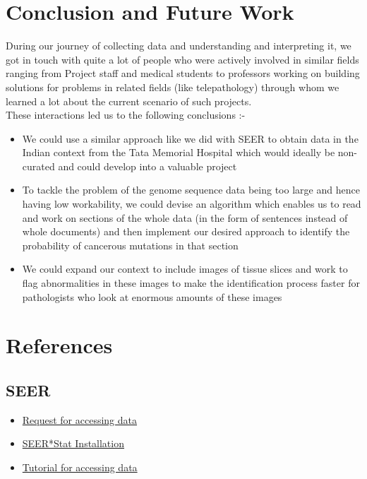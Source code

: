 \documentclass[15pt]{article}
\begin{document}
\section{Conclusion and Future Work}
During our journey of collecting data and understanding and interpreting it, we got in touch with quite \hspace*{5mm} a lot of people who were actively involved in similar fields ranging from Project staff and medical students \hspace*{4.5mm} to professors working on building solutions for problems in related fields (like telepathology) through \hspace*{4.55mm}  whom we learned a lot about the current scenario of such projects. \\\hspace*{4.5mm} These interactions led us to the following conclusions :- \\
\begin{itemize}
\item We could use a similar approach like we did with SEER to obtain data in the Indian context from the Tata Memorial Hospital which would ideally be non-curated and could develop into a valuable project
\item To tackle the problem of the genome sequence data being too large and hence having low workability, we could devise an algorithm which enables us to read and work on sections of the whole data (in the form of sentences instead of whole documents) and then implement our desired approach to identify the probability of cancerous mutations in that section
\item We could expand our context to include images of tissue slices and work to flag abnormalities in these images to make the identification process faster for pathologists who look at enormous amounts of these images
\end{itemize}



\section{References}
\subsection{SEER}
\begin{itemize}
\item \href{https://seer.cancer.gov/seertrack/data/request/}{Request for accessing data}
\item \href{https://seer.cancer.gov/seerstat/software/}{SEER*Stat Installation}
\item \href{https://seer.cancer.gov/seerstat/tutorials/case1a/webprint/}{Tutorial for accessing data}
\end{itemize}
\end{document}
